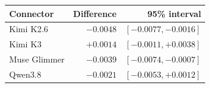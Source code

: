 \begin{tabular}{lrr}
\toprule
Connector & Difference & 95\% interval\\
\midrule
Kimi K2.6 & $-0.0048$ & $[-0.0077, -0.0016]$\\
Kimi K3 & $+0.0014$ & $[-0.0011, +0.0038]$\\
Muse Glimmer & $-0.0039$ & $[-0.0074, -0.0007]$\\
Qwen3.8 & $-0.0021$ & $[-0.0053, +0.0012]$\\
\bottomrule
\end{tabular}
